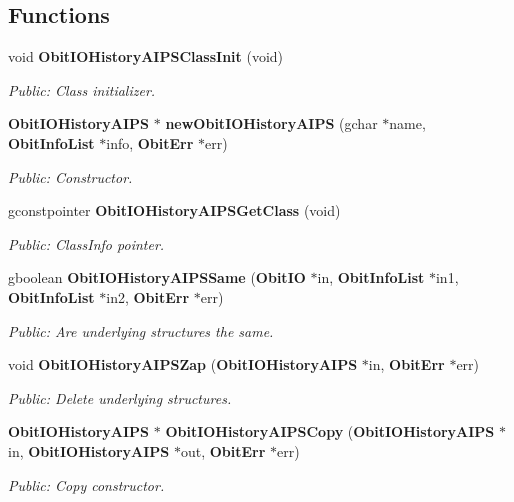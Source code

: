 \subsection*{Functions}
\begin{CompactItemize}
\item 
void {\bf Obit\-IOHistory\-AIPSClass\-Init} (void)
\begin{CompactList}\small\item\em Public: Class initializer. \item\end{CompactList}\item 
{\bf Obit\-IOHistory\-AIPS} $\ast$ {\bf new\-Obit\-IOHistory\-AIPS} (gchar $\ast$name, {\bf Obit\-Info\-List} $\ast$info, {\bf Obit\-Err} $\ast$err)
\begin{CompactList}\small\item\em Public: Constructor. \item\end{CompactList}\item 
gconstpointer {\bf Obit\-IOHistory\-AIPSGet\-Class} (void)
\begin{CompactList}\small\item\em Public: Class\-Info pointer. \item\end{CompactList}\item 
gboolean {\bf Obit\-IOHistory\-AIPSSame} ({\bf Obit\-IO} $\ast$in, {\bf Obit\-Info\-List} $\ast$in1, {\bf Obit\-Info\-List} $\ast$in2, {\bf Obit\-Err} $\ast$err)
\begin{CompactList}\small\item\em Public: Are underlying structures the same. \item\end{CompactList}\item 
void {\bf Obit\-IOHistory\-AIPSZap} ({\bf Obit\-IOHistory\-AIPS} $\ast$in, {\bf Obit\-Err} $\ast$err)
\begin{CompactList}\small\item\em Public: Delete underlying structures. \item\end{CompactList}\item 
{\bf Obit\-IOHistory\-AIPS} $\ast$ {\bf Obit\-IOHistory\-AIPSCopy} ({\bf Obit\-IOHistory\-AIPS} $\ast$in, {\bf Obit\-IOHistory\-AIPS} $\ast$out, {\bf Obit\-Err} $\ast$err)
\begin{CompactList}\small\item\em Public: Copy constructor. \item\end{CompactList}\item 

\end{CompactItemize}
